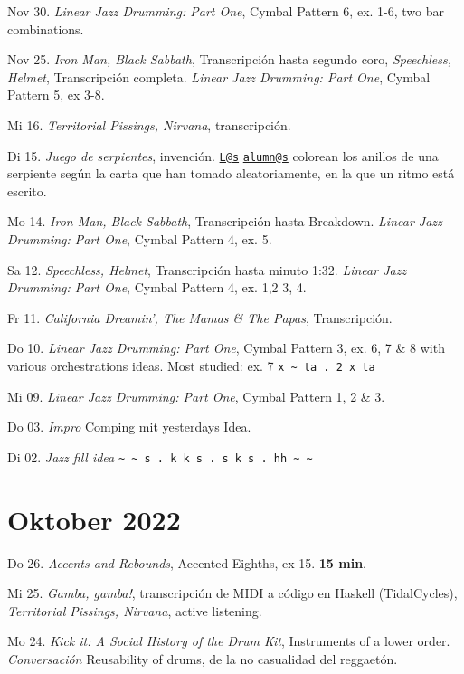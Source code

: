 \documentclass[
]{book}
\begin{document}
Nov 30. \emph{Linear Jazz Drumming: Part One}, Cymbal Pattern 6, ex. 1-6, two bar combinations.

Nov 25. \emph{Iron Man, Black Sabbath}, Transcripción hasta segundo coro, \emph{Speechless, Helmet}, Transcripción completa. \emph{Linear Jazz Drumming: Part One}, Cymbal Pattern 5, ex 3-8.

Mi 16. \emph{Territorial Pissings, Nirvana}, transcripción.

Di 15. \emph{Juego de serpientes}, invención. \href{mailto:L@s}{\nolinkurl{L@s}} \href{mailto:alumn@s}{\nolinkurl{alumn@s}} colorean los anillos de una serpiente según la carta que han tomado aleatoriamente, en la que un ritmo está escrito.

Mo 14. \emph{Iron Man, Black Sabbath}, Transcripción hasta Breakdown. \emph{Linear Jazz Drumming: Part One}, Cymbal Pattern 4, ex. 5.

Sa 12. \emph{Speechless, Helmet}, Transcripción hasta minuto 1:32. \emph{Linear Jazz Drumming: Part One}, Cymbal Pattern 4, ex. 1,2 3, 4.

Fr 11. \emph{California Dreamin', The Mamas \& The Papas}, Transcripción.

Do 10. \emph{Linear Jazz Drumming: Part One}, Cymbal Pattern 3, ex. 6, 7 \& 8 with various orchestrations ideas. Most studied: ex. 7 \texttt{x\ \textasciitilde{}\ ta\ .\ 2\ x\ ta}

Mi 09. \emph{Linear Jazz Drumming: Part One}, Cymbal Pattern 1, 2 \& 3.

Do 03. \emph{Impro} Comping mit yesterdays Idea.

Di 02. \emph{Jazz fill idea} \texttt{\textasciitilde{}\ \textasciitilde{}\ s\ .\ k\ k\ s\ .\ s\ k\ s\ .\ hh\ \textasciitilde{}\ \textasciitilde{}}

\hypertarget{oktober-2022}{%
\section*{Oktober 2022}\label{oktober-2022}}

Do 26. \emph{Accents and Rebounds}, Accented Eighths, ex 15. \textbf{15 min}.

Mi 25. \emph{Gamba, gamba!}, transcripción de MIDI a código en Haskell (TidalCycles), \emph{Territorial Pissings, Nirvana}, active listening.

Mo 24. \emph{Kick it: A Social History of the Drum Kit}, Instruments of a lower order. \emph{Conversación} Reusability of drums, de la no casualidad del reggaetón.
\end{document}
